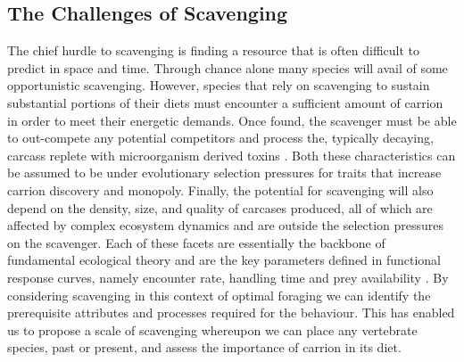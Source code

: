 \documentclass[a4paper,12pt]{article}
\begin{document}

\subsection*{The Challenges of Scavenging} %
The chief hurdle to scavenging is finding a resource that is often difficult to predict in space and time.
Through chance alone many species will avail of some opportunistic scavenging. %
However, species that rely on scavenging to sustain substantial portions of their diets must encounter a sufficient amount of carrion in order to meet their energetic demands.
Once found, the scavenger must be able to out-compete any potential  competitors and process the, typically decaying, carcass replete with microorganism derived toxins  \citep{ruxton2014fruit}. Both these characteristics can be assumed to be under evolutionary selection pressures for traits that increase carrion discovery and monopoly.
Finally, the potential for scavenging will also depend on the density, size, and quality of carcases produced, all of which are affected by complex ecosystem dynamics and are outside the selection pressures on the scavenger.
Each of these facets are essentially the backbone of fundamental ecological theory and are the key parameters defined in functional response curves, namely encounter rate, handling time and prey availability \citep{jeschke2002predator}. %
By considering scavenging in this context of optimal foraging we can identify the prerequisite attributes and processes required for the behaviour. 
This has enabled us to propose a scale of scavenging whereupon we can place any vertebrate species, past or present, and assess the importance of carrion in its diet. 
\end{document}
